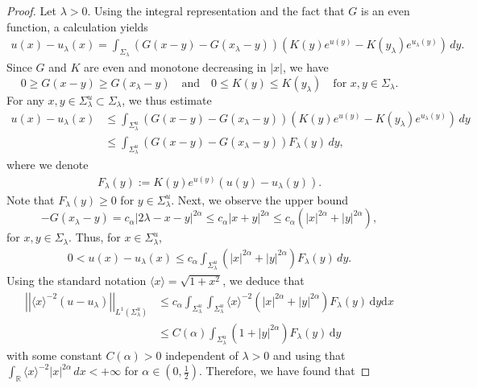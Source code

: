 \documentclass[reqno,10pt,a4paper]{amsart}
\theoremstyle{definition}
\theoremstyle{definition}
\theoremstyle{remark}
\theoremstyle{remark}
\numberwithin{equation}{section}
\newcommand{\R}{\mathbb{R}}
\begin{document}
\begin{appendix}
\begin{proof}
    Let $\lambda > 0$. Using the integral representation and the fact that $G$ is an even function, a calculation yields \begin{align*}
        u(x)-u_\lambda(x) = \int_{\Sigma_\lambda} (G(x-y)-G(x_\lambda-y))\left( K(y) e^{u(y)} - K(y_\lambda) e^{u_\lambda(y)}\right) \, dy.
    \end{align*}
    Since $G$ and $K$ are even and monotone decreasing in $|x|$, we have
    $$
    0 \geq G(x-y) \geq G(x_\lambda-y) \quad \mbox{and} \quad 0 \leq K(y) \leq K(y_\lambda) \quad \mbox{for $x,y \in \Sigma_\lambda$}.
    $$
    For any $x,y \in \Sigma_\lambda^u \subset \Sigma_\lambda$, we thus estimate 
    \begin{align*}
        u(x) - u_\lambda(x) &\leq \int_{\Sigma_\lambda^u} (G(x-y)-G(x_\lambda-y)) \left(K(y) e^{u(y)}-K(y_\lambda) e^{u_\lambda(y)}\right) \, dy \\
        &\leq \int_{\Sigma_\lambda^u} (G(x-y)-G(x_\lambda-y)) F_\lambda(y) \, dy,
    \end{align*}
    where we denote \begin{align*}
        F_\lambda(y) := K(y) e^{u(y)} (u(y)-u_\lambda(y)).
    \end{align*}
    Note that $F_\lambda(y) \geq 0$ for $y \in \Sigma_\lambda^u$. Next, we observe the upper bound 
    $$
        -G(x_\lambda-y) = c_\alpha |2\lambda -x -y|^{2\alpha} \leq c_\alpha |x + y|^{2 \alpha} \leq c_\alpha \left(|x|^{2 \alpha} + |y|^{2 \alpha}\right),
    $$
    for $x,y \in \Sigma_\lambda$. Thus, for $x \in \Sigma_\lambda^u$, 
    \begin{align*}
        0 < u(x) - u_\lambda(x) \leq c_\alpha \int_{\Sigma_\lambda^u} \left(|x|^{2\alpha} + |y|^{2 \alpha}\right) F_\lambda(y) \, dy.
    \end{align*}
    Using the standard notation $\langle x \rangle = \sqrt{1+x^2}$, we deduce that
    \begin{align*}
        \left|\left|\langle x\rangle^{-2}(u-u_\lambda)\right|\right|_{L^1(\Sigma_\lambda^u)} &\leq c_\alpha \int_{\Sigma_\lambda^u} \int_{\Sigma_\lambda^u} \langle x\rangle^{-2} \left(|x|^{2 \alpha} + |y|^{2\alpha}\right) F_\lambda(y) \, \mathrm{d}y \mathrm{d}x \\
        &\leq C(\alpha) \int_{\Sigma_\lambda^u} \left(1 + |y|^{2 \alpha}\right) F_\lambda(y) \, \mathrm{d}y
    \end{align*}
    with some constant $C(\alpha)>0$ independent of $\lambda >0$ and using that $\int_{\R} \langle x \rangle^{-2} |x|^{2 \alpha} \, dx < +\infty$ for $\alpha \in (0, \frac{1}{2})$. Therefore, we have found that 

\end{proof}
\end{appendix}
\end{document}
